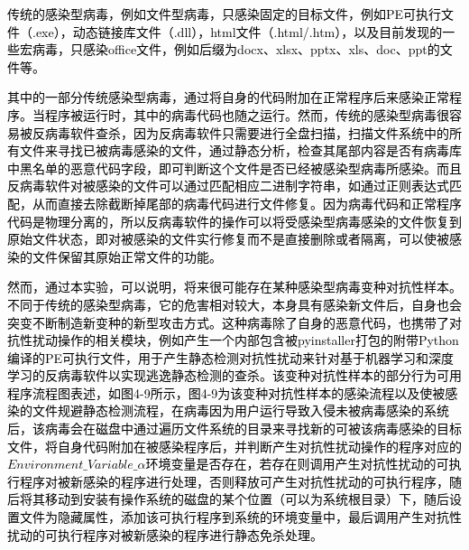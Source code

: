 \textcolor{black}{传统的感染型病毒，例如文件型病毒，只感染固定的目标文件\cite{ref37}，例如PE可执行文件（.exe），动态链接库文件（.dll），html文件（.html/.htm），以及目前发现的一些宏病毒，只感染office文件，例如后缀为docx、xlsx、pptx、xls、doc、ppt的文件等。}

\textcolor{black}{其中的一部分传统感染型病毒，通过将自身的代码附加在正常程序后来感染正常程序。当程序被运行时，其中的病毒代码也随之运行。然而，传统的感染型病毒很容易被反病毒软件查杀，因为反病毒软件只需要进行全盘扫描，扫描文件系统中的所有文件来寻找已被病毒感染的文件，通过静态分析，检查其尾部内容是否有病毒库中黑名单的恶意代码字段，即可判断这个文件是否已经被感染型病毒所感染。而且反病毒软件对被感染的文件可以通过匹配相应二进制字符串，如通过正则表达式匹配，从而直接去除截断掉尾部的病毒代码进行文件修复。因为病毒代码和正常程序代码是物理分离的，所以反病毒软件的操作可以将受感染型病毒感染的文件恢复到原始文件状态，即对被感染的文件实行修复而不是直接删除或者隔离，可以使被感染的文件保留其原始正常文件的功能。}

\textcolor{black}{然而，通过本实验，可以说明，将来很可能存在某种感染型病毒变种对抗性样本。不同于传统的感染型病毒，它的危害相对较大，本身具有感染新文件后，自身也会突变不断制造新变种的新型攻击方式。这种病毒除了自身的恶意代码，也携带了对抗性扰动操作的相关模块，例如产生一个内部包含被pyinstaller打包的附带Python编译的PE可执行文件，用于产生静态检测对抗性扰动来针对基于机器学习和深度学习的反病毒软件以实现逃逸静态检测的查杀。该变种对抗性样本的部分行为可用程序流程图表述，如图4-9所示，图4-9为该变种对抗性样本的感染流程以及使被感染的文件规避静态检测流程，在病毒因为用户运行导致入侵未被病毒感染的系统后，该病毒会在磁盘中通过遍历文件系统的目录来寻找新的可被该病毒感染的目标文件，将自身代码附加在被感染程序后，并判断产生对抗性扰动操作的程序对应的$Environment\_Variable\_\alpha$环境变量是否存在，若存在则调用产生对抗性扰动的可执行程序对被新感染的程序进行处理，否则释放可产生对抗性扰动的可执行程序，随后将其移动到安装有操作系统的磁盘的某个位置（可以为系统根目录）下，随后设置文件为隐藏属性，添加该可执行程序到系统的环境变量中，最后调用产生对抗性扰动的可执行程序对被新感染的程序进行静态免杀处理。}

